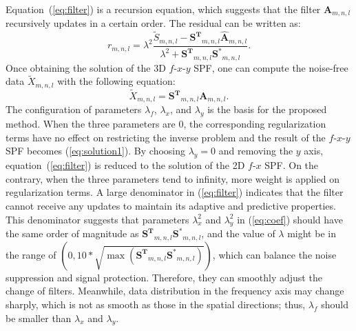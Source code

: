 Equation~(\ref{eq:filter}) is a recursion equation, which suggests
that the filter $\mathbf{A}_{m,n,l}$ recursively updates in a certain
order. The residual can be written as:
\begin{equation}
    \label{eq:residual}
    r_{m,n,l}=  \lambda^{2} \frac{ \tilde{S}_{m,n,l} - \mathbf{S^{T}}_{m,n,l}
        \mathbf{\hat{A}}_{m,n,l} } { \lambda^{2} + \mathbf{S^{T}}_{m,n,l}
        \mathbf{S^{*}}_{m,n,l} }.
\end{equation}
Once obtaining the solution of the 3D $f$-$x$-$y$ SPF, one can compute
the noise-free data $\tilde{X}_{m,n,l}$ with the following equation:
\begin{equation}
    \label{eq:noise-free}
    \tilde{X}_{m,n,l} = \mathbf{S^{T}}_{m,n,l} \mathbf{A}_{m,n,l}.
\end{equation}
The configuration of parameters $\lambda_{f}$, $\lambda_{x}$, and
$\lambda_{y}$ is the basis for the proposed method. When the three
parameters are $0$, the corresponding regularization terms have no
effect on restricting the inverse problem and the result of the
$f$-$x$-$y$ SPF becomes (\ref{eq:solution1}). By choosing $\lambda_{y}
= 0$ and removing the $y$ axis, equation~(\ref{eq:filter}) is reduced
to the solution of the 2D $f$-$x$ SPF. On the contrary, when the three
parameters tend to infinity, more weight is applied on regularization
terms. A large denominator in (\ref{eq:filter}) indicates that the
filter cannot receive any updates to maintain its adaptive and
predictive properties. This denominator suggests that parameters
$\lambda_{x}^{2}$ and $\lambda_{y}^{2}$ in (\ref{eq:coef}) should have
the same order of magnitude as
$\mathbf{S^{T}}_{m,n,l}\mathbf{S^{*}}_{m,n,l}$, and the value of
$\lambda$ might be in the range of $(0, 10*\sqrt{ \max(
  \mathbf{S^{T}}_{m,n,l}\mathbf{S^{*}}_{m,n,l}) })$, which can balance
the noise suppression and signal protection.  Therefore, they can
smoothly adjust the change of filters.  Meanwhile, data distribution
in the frequency axis may change sharply, which is not as smooth as
those in the spatial directions; thus, $\lambda_{f}$ should be smaller
than $\lambda_{x}$ and $\lambda_{y}$.


